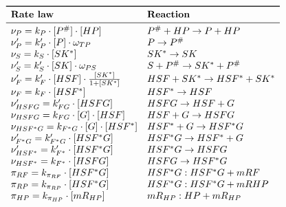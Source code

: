 \documentclass[oneside, 10pt, a4paper, twocolumn]{article}
\begin{document}
\bgroup
\def\arraystretch{1.5}%
\begin{table}[h!]
\[\begin{array}{ll}
\toprule
 \text{\textbf{Rate law}}                                                              & \text{\textbf{Reaction}}                 \\
\midrule
 \nu_P        = k_{P} \cdot [P^\#] \cdot [HP]                                 & P^\# + HP \rightarrow P + HP    \\
 \nu_P'       = k_{P}' \cdot [P] \cdot \omega_{TP}                            & P \rightarrow P^\#              \\
 \nu_S        = k_S \cdot [SK^*]                                              & SK^* \rightarrow SK             \\
 \nu_S'       = k_{S}' \cdot [SK] \cdot \omega_{PS}                            & S+P^\# \rightarrow SK^*+P^\#    \\
 \nu_F'       = k_{{F}}' \cdot [HSF] \cdot \frac{[SK^*]}{1+[SK^*]}            & HSF+SK^* \rightarrow HSF^*+SK^* \\
 \nu_F        = k_{{F}} \cdot [HSF^*]                                         & HSF^* \rightarrow HSF           \\    
 \nu_{HSFG}'  = k_{{F}G}' \cdot [HSFG]                                        & HSFG \rightarrow HSF + G        \\
 \nu_{HSFG}   = k_{{F}G} \cdot [G] \cdot [HSF]                                & HSF + G \rightarrow HSFG        \\ 
 \nu_{HSF^*G} = k_{{F}^*G} \cdot [G] \cdot [HSF^*]                            & HSF^* + G \rightarrow HSF^*G    \\ 
 \nu_{F^*G}'  = k_{{F}^*G}' \cdot [HSF^*G]                                    & HSF^*G \rightarrow HSF^* + G    \\
 \nu_{HSF^*}' = k_{{F}^*}' \cdot [HSF^*G]                                     & HSF^*G \rightarrow HSFG         \\
 \nu_{HSF^*}  = k_{{F}^*} \cdot [HSFG]                                        & HSFG \rightarrow HSF^*G         \\
 \pi_{RF}     = k_{\pi_{RF}} \cdot [HSF^*G]                                   & HSF^*G: HSF^*G + mRF            \\
 \pi_{RP}     = k_{\pi_{RP}} \cdot [HSF^*G]                                   & HSF^*G: HSF^*G + mRHP           \\
 \pi_{HP}     = k_{\pi_{HP}} \cdot [mR_{HP}]                                  & mR_{HP}: HP + mR_{HP}           \\

\end{array}\]
\end{table}
\end{document}
